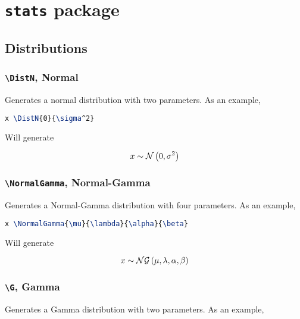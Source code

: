 \documentclass[]{article}
\title{}
\author{}
\begin{document}
\maketitle

\begin{abstract}

\end{abstract}

\section{\texttt{stats} package}

\subsection{Distributions}

\subsubsection{\texttt{\textbackslash DistN}, Normal}

Generates a normal distribution with two parameters.
As an example,

\begin{lstlisting}[language=TeX]
x \DistN{0}{\sigma^2}
\end{lstlisting}

Will generate

\[ x \sim \mathcal{N} \left( 0,\sigma^2 \right) \]

\subsubsection{\texttt{\textbackslash NormalGamma}, Normal-Gamma}

Generates a Normal-Gamma distribution with four parameters.
As an example,

\begin{lstlisting}[language=TeX]
x \NormalGamma{\mu}{\lambda}{\alpha}{\beta}
\end{lstlisting}

Will generate

\[ x \sim \mathcal{NG} \left(\mu,\lambda,\alpha,\beta\right) \]

\subsubsection{\texttt{\textbackslash G}, Gamma}

Generates a Gamma distribution with two parameters.
As an example,
\end{document}
